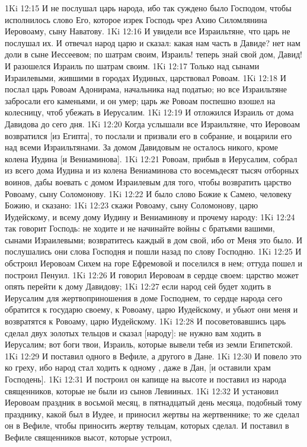 \vs 1Ki 12:15 И не послушал царь народа, ибо так суждено было Господом, чтобы исполнилось слово Его, которое изрек Господь чрез Ахию Силомлянина Иеровоаму, сыну Наватову.
\vs 1Ki 12:16 И увидели все Израильтяне, что царь не послушал их. И отвечал народ царю и сказал: какая нам часть в Давиде? нет нам доли в сыне Иессеевом; по шатрам своим, Израиль! теперь знай свой дом, Давид! И разошелся Израиль по шатрам своим.
\vs 1Ki 12:17 Только над сынами Израилевыми, жившими в городах Иудиных, царствовал Ровоам.
\vs 1Ki 12:18 И послал царь Ровоам Адонирама, начальника над податью; но все Израильтяне забросали его каменьями, и он умер; царь же Ровоам поспешно взошел на колесницу, чтоб убежать в Иерусалим.
\vs 1Ki 12:19 И отложился Израиль от дома Давидова до сего дня.
\vs 1Ki 12:20 Когда услышали все Израильтяне, что Иеровоам возвратился [из Египта], то послали и призвали его в собрание, и воцарили его над всеми Израильтянами. За домом Давидовым не осталось никого, кроме колена Иудина [и Вениаминова].
\vs 1Ki 12:21 Ровоам, прибыв в Иерусалим, собрал из всего дома Иудина и из колена Вениаминова сто восемьдесят тысяч отборных воинов, дабы воевать с домом Израилевым для того, чтобы возвратить царство Ровоаму, сыну Соломонову.
\rsbpar\vs 1Ki 12:22 И было слово Божие к Самею, человеку Божию, и сказано:
\vs 1Ki 12:23 скажи Ровоаму, сыну Соломонову, царю Иудейскому, и всему дому Иудину и Вениаминову и прочему народу:
\vs 1Ki 12:24 так говорит Господь: не ходите и не начинайте войны с братьями вашими, сынами Израилевыми; возвратитесь каждый в дом свой, ибо от Меня это было. И послушались они слова Господня и пошли назад по слову Господню.
\rsbpar\vs 1Ki 12:25 И обстроил Иеровоам Сихем на горе Ефремовой и поселился в нем; оттуда пошел и построил Пенуил.
\vs 1Ki 12:26 И говорил Иеровоам в сердце своем: царство может опять перейти к дому Давидову;
\vs 1Ki 12:27 если народ сей будет ходить в Иерусалим для жертвоприношения в доме Господнем, то сердце народа сего обратится к государю своему, к Ровоаму, царю Иудейскому, и убьют они меня и возвратятся к Ровоаму, царю Иудейскому.
\vs 1Ki 12:28 И посоветовавшись царь сделал двух золотых тельцов и сказал [народу]: не нужно вам ходить в Иерусалим; вот боги твои, Израиль, которые вывели тебя из земли Египетской.
\vs 1Ki 12:29 И поставил одного в Вефиле, а другого в Дане.
\vs 1Ki 12:30 И повело это ко греху, ибо народ стал ходить к одному , даже в Дан, [и оставили храм Господень].
\vs 1Ki 12:31 И построил он капище на высоте и поставил из народа священников, которые не были из сынов Левииных.
\vs 1Ki 12:32 И установил Иеровоам праздник в восьмой месяц, в пятнадцатый день месяца, подобный тому празднику, какой был в Иудее, и приносил жертвы на жертвеннике; то же сделал он в Вефиле, чтобы приносить жертву тельцам, которых сделал. И поставил в Вефиле священников высот, которые устроил,
